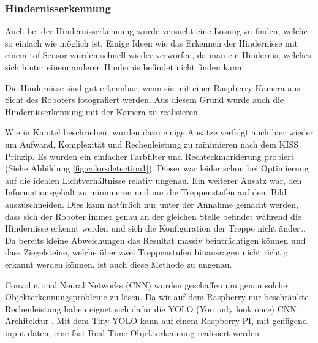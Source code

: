 \subsubsection{Hindernisserkennung}
\label{sec:hindernisserkennung}
Auch bei der Hindernisserkennung wurde versucht eine Lösung zu finden, welche so einfach wie möglich ist.
Einige Ideen wie das Erkennen der Hindernisse mit einem \acrshort{tof} Sensor wurden schnell wieder verworfen,
da man ein Hindernis, welches sich hinter einem anderen Hindernis befindet nicht finden kann.

Die Hindernisse sind gut erkennbar, wenn sie mit einer Raspberry Kamera aus Sicht des Roboters 
fotografiert werden. Aus diesem Grund wurde
auch die Hindernisserkennung mit der Kamera zu realisieren.

Wie in Kapitel  beschrieben, wurden dazu einige Ansätze verfolgt
auch hier wieder um Aufwand, Komplexität und Rechenleistung zu minimieren nach dem KISS Prinzip.
Es wurden ein einfacher Farbfilter und Rechteckmarkierung probiert (Siehe Abbildung \ref{fig:color-detection1}).
Dieser war leider schon bei Optimierung auf die idealen Lichtverhältnisse relativ ungenau.
Ein weiterer Ansatz war, den Informationsgehalt zu minimieren und nur die Treppenstufen auf dem Bild auszuschneiden.
Dies kann natürlich nur unter der Annahme gemacht werden, dass sich der Roboter immer genau an der gleichen Stelle
befindet während die Hindernisse erkennt werden und sich die Konfiguration der Treppe nicht ändert.
Da bereits kleine Abweichungen das Resultat massiv beinträchtigen können und dass Ziegelsteine, welche
über zwei Treppenstufen hinausragen nicht richtig erkannt werden können, ist auch diese Methode zu ungenau.

Convolutional Neural Networks (CNN) wurden geschaffen um genau solche Objekterkennungsprobleme zu lösen.
Da wir auf dem Raspberry nur beschränkte Rechenleistung haben eignet sich dafür die YOLO (You only look once) CNN 
Architektur \cite{YOLOv3}. Mit dem Tiny-YOLO kann auf einem Raspberry PI, mit genügend input daten, eine
fast Real-Time Objekterkennung realisiert werden \cite{YOLORaspi}.


